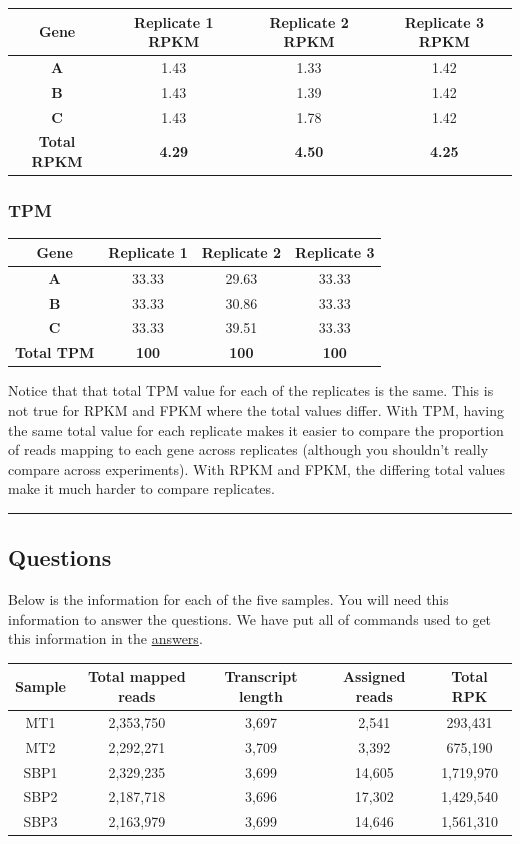 \documentclass[11pt]{article}
\begin{document}
\begin{longtable}[]{@{}cccc@{}}
\toprule
Gene & Replicate 1 RPKM & Replicate 2 RPKM & Replicate 3
RPKM\tabularnewline
\midrule
\endhead
\textbf{A} & 1.43 & 1.33 & 1.42\tabularnewline
\textbf{B} & 1.43 & 1.39 & 1.42\tabularnewline
\textbf{C} & 1.43 & 1.78 & 1.42\tabularnewline
\textbf{Total RPKM} & \textbf{4.29} & \textbf{4.50} &
\textbf{4.25}\tabularnewline
\bottomrule
\end{longtable}

\hypertarget{tpm}{%
\subsubsection{TPM}\label{tpm}}

\begin{longtable}[]{@{}cccc@{}}
\toprule
Gene & Replicate 1 & Replicate 2 & Replicate 3\tabularnewline
\midrule
\endhead
\textbf{A} & 33.33 & 29.63 & 33.33\tabularnewline
\textbf{B} & 33.33 & 30.86 & 33.33\tabularnewline
\textbf{C} & 33.33 & 39.51 & 33.33\tabularnewline
\textbf{Total TPM} & \textbf{100} & \textbf{100} &
\textbf{100}\tabularnewline
\bottomrule
\end{longtable}

Notice that that total TPM value for each of the replicates is the same.
This is not true for RPKM and FPKM where the total values differ. With
TPM, having the same total value for each replicate makes it easier to
compare the proportion of reads mapping to each gene across replicates
(although you shouldn't really compare across experiments). With RPKM
and FPKM, the differing total values make it much harder to compare
replicates.

    \begin{center}\rule{0.5\linewidth}{0.5pt}\end{center}

    \hypertarget{questions}{%
\subsection{Questions}\label{questions}}

Below is the information for each of the five samples. You will need
this information to answer the questions. We have put all of commands
used to get this information in the \href{aanswers.ipynb}{answers}.

\begin{longtable}[]{@{}ccccc@{}}
\toprule
Sample & Total mapped reads & Transcript length & Assigned reads & Total
RPK\tabularnewline
\midrule
\endhead
MT1 & 2,353,750 & 3,697 & 2,541 & 293,431\tabularnewline
MT2 & 2,292,271 & 3,709 & 3,392 & 675,190\tabularnewline
SBP1 & 2,329,235 & 3,699 & 14,605 & 1,719,970\tabularnewline
SBP2 & 2,187,718 & 3,696 & 17,302 & 1,429,540\tabularnewline
SBP3 & 2,163,979 & 3,699 & 14,646 & 1,561,310\tabularnewline
\bottomrule
\end{longtable}
\end{document}
